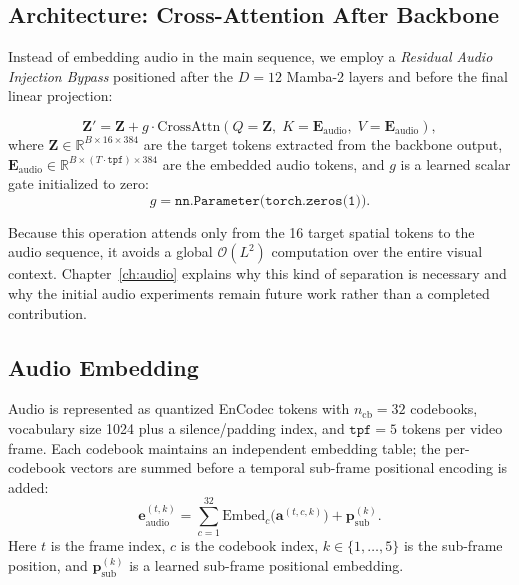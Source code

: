 \documentclass[12pt,letterpaper]{report}
\begin{document}
\subsection{Architecture: Cross-Attention After Backbone}

Instead of embedding audio in the main sequence, we employ a \emph{Residual Audio Injection Bypass} positioned after the $D=12$ Mamba-2 layers and before the final linear projection:

\begin{equation}\label{eq:audio-bypass}
    \mathbf{Z}' = \mathbf{Z} + g \cdot \mathrm{CrossAttn}(
        Q{=}\mathbf{Z},\;
        K{=}\mathbf{E}_{\mathrm{audio}},\;
        V{=}\mathbf{E}_{\mathrm{audio}}
    ),
\end{equation}
%
where $\mathbf{Z} \in \mathbb{R}^{B \times 16 \times 384}$ are the target tokens extracted from the backbone output, $\mathbf{E}_{\mathrm{audio}} \in \mathbb{R}^{B \times (T \cdot \texttt{tpf}) \times 384}$ are the embedded audio tokens, and $g$ is a learned scalar gate initialized to zero:
%
\begin{equation}
    g = \texttt{nn.Parameter(torch.zeros(1))}.
\end{equation}

Because this operation attends only from the 16 target spatial tokens to the audio sequence, it avoids a global $\mathcal{O}(L^2)$ computation over the entire visual context. Chapter~\ref{ch:audio} explains why this kind of separation is necessary and why the initial audio experiments remain future work rather than a completed contribution.

\subsection{Audio Embedding}

Audio is represented as quantized EnCodec tokens with $n_{\mathrm{cb}} = 32$ codebooks, vocabulary size 1024 plus a silence/padding index, and $\texttt{tpf} = 5$ tokens per video frame. Each codebook maintains an independent embedding table; the per-codebook vectors are summed before a temporal sub-frame positional encoding is added:
%
\begin{equation}
    \mathbf{e}_{\mathrm{audio}}^{(t, k)} = \sum_{c=1}^{32}
        \mathrm{Embed}_c\bigl(\mathbf{a}^{(t, c, k)}\bigr)
        + \mathbf{p}_{\mathrm{sub}}^{(k)}.
\end{equation}
%
Here $t$ is the frame index, $c$ is the codebook index, $k \in \{1, \ldots, 5\}$ is the sub-frame position, and $\mathbf{p}_{\mathrm{sub}}^{(k)}$ is a learned sub-frame positional embedding.
\end{document}
